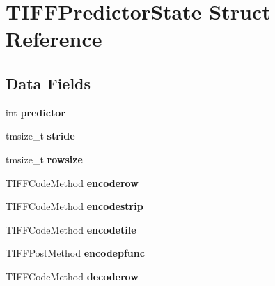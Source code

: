 \hypertarget{struct_t_i_f_f_predictor_state}{}\section{T\+I\+F\+F\+Predictor\+State Struct Reference}
\label{struct_t_i_f_f_predictor_state}
\subsection*{Data Fields}
\begin{DoxyCompactItemize}
\item 
\hypertarget{struct_t_i_f_f_predictor_state_a31c9cdfbea01c488b9c97012b03ae7d3}{}int {\bfseries predictor}\label{struct_t_i_f_f_predictor_state_a31c9cdfbea01c488b9c97012b03ae7d3}

\item 
\hypertarget{struct_t_i_f_f_predictor_state_aeb658de232b5615426d7269ddb01cb1c}{}tmsize\+\_\+t {\bfseries stride}\label{struct_t_i_f_f_predictor_state_aeb658de232b5615426d7269ddb01cb1c}

\item 
\hypertarget{struct_t_i_f_f_predictor_state_a8ad8eecc46505486555131d64a444a52}{}tmsize\+\_\+t {\bfseries rowsize}\label{struct_t_i_f_f_predictor_state_a8ad8eecc46505486555131d64a444a52}

\item 
\hypertarget{struct_t_i_f_f_predictor_state_aed18853b4573ee8b431ae187b9c5e3fa}{}T\+I\+F\+F\+Code\+Method {\bfseries encoderow}\label{struct_t_i_f_f_predictor_state_aed18853b4573ee8b431ae187b9c5e3fa}

\item 
\hypertarget{struct_t_i_f_f_predictor_state_a89ee6e8337e2f873813b579e57acfd6d}{}T\+I\+F\+F\+Code\+Method {\bfseries encodestrip}\label{struct_t_i_f_f_predictor_state_a89ee6e8337e2f873813b579e57acfd6d}

\item 
\hypertarget{struct_t_i_f_f_predictor_state_a10efd6efb642b16c9085468508b23406}{}T\+I\+F\+F\+Code\+Method {\bfseries encodetile}\label{struct_t_i_f_f_predictor_state_a10efd6efb642b16c9085468508b23406}

\item 
\hypertarget{struct_t_i_f_f_predictor_state_adc8308784e14928564ce83daaac3b4f9}{}T\+I\+F\+F\+Post\+Method {\bfseries encodepfunc}\label{struct_t_i_f_f_predictor_state_adc8308784e14928564ce83daaac3b4f9}

\item 
\hypertarget{struct_t_i_f_f_predictor_state_a2477a9f29266fd54a506bd20ce1b42d8}{}T\+I\+F\+F\+Code\+Method {\bfseries decoderow}\label{struct_t_i_f_f_predictor_state_a2477a9f29266fd54a506bd20ce1b42d8}


\end{DoxyCompactItemize}
